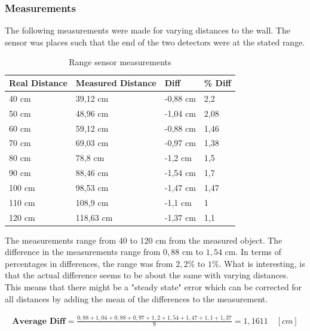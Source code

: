 \subsubsection{Measurements}
The following measurements were made for varying distances to the wall. The sensor was places such that the end of the two detectors were at the stated range. 


\begin{table}[H]
\centering
\begin{tabular}{|l|l|l|l|}
\hline
\textbf{Real Distance} & \textbf{Measured Distance} & \textbf{Diff} & \textbf{\% Diff} \\ \hline
40 cm                  & 39,12 cm                   & -0,88 cm       & 2,2           \\ \hline
50 cm                  & 48,96 cm                   & -1,04 cm       & 2,08           \\ \hline
60 cm                  & 59,12 cm                   & -0,88 cm       & 1,46           \\ \hline
70 cm                  & 69,03 cm                   & -0,97 cm       & 1,38           \\ \hline
80 cm                  & 78,8 cm                    & -1,2 cm        & 1,5            \\ \hline
90 cm                  & 88,46 cm                   & -1,54 cm       & 1,7           \\ \hline
100 cm                 & 98,53 cm                   & -1,47 cm       & 1,47          \\ \hline
110 cm                 & 108,9 cm                   & -1,1 cm        & 1           \\ \hline
120 cm                 & 118,63 cm                  & -1,37 cm       & 1,1          \\ \hline
\end{tabular}
\caption{Range sensor measurements}
\label{rangemeasurements}
\end{table}
The measurements range from 40 to 120 cm from the measured object. The difference in the measurements range from $0,88$ cm to $1,54$ cm. In terms of percentages in differences, the range was from $2,2\%$ to $1\%$. What is interesting, is that the actual difference seems to be about the same with varying distances. This means that there might be a "steady state" error which can be corrected for all distances by adding the mean of the differences to the measurement.

\begin{align*}
\textbf{Average Diff} = \frac{0,88+1,04+0,88+0,97+1,2+1,54+1,47+1,1+1,37}{9} = 1,1611\quad [cm]
\end{align*}

